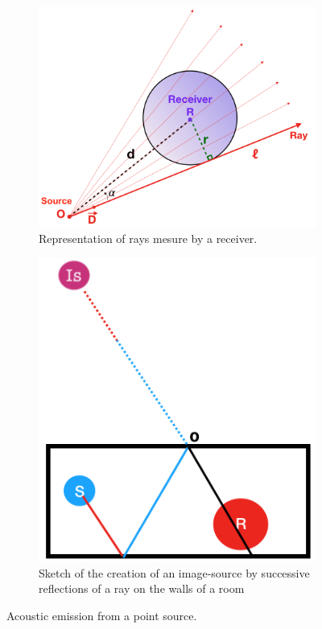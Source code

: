 \documentclass[AMA,STIX1COL]{WileyNJD-v2}
\begin{document}
%
\begin{figure}[b]
	\centering
	\begin{subfigure}{0.5\textwidth}
		\includegraphics[width=\textwidth]{rays}
		\caption{Representation of rays mesure by a receiver.}
		\label{rays}
	\end{subfigure}	
	\qquad
		\begin{subfigure}{0.4\textwidth}
	\includegraphics[width=\linewidth]{schema_SI}
	\caption{Sketch of the creation of an image-source by successive reflections of a ray on the walls of a room}
	\label{schema_SI}
	\end{subfigure}
	\caption{Acoustic emission from a point source.}
\end{figure}
\end{document}
